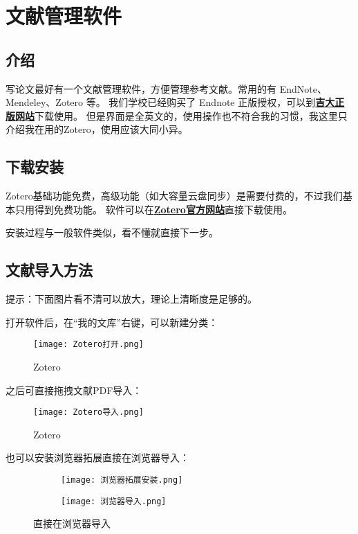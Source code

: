\section{文献管理软件}
\subsection{介绍}

写论文最好有一个文献管理软件，方便管理参考文献。常用的有 EndNote、Mendeley、Zotero 等。
我们学校已经购买了 Endnote 正版授权，可以到\textbf{\textcolor{blue}{\href{https://zbhrj1.jlu.edu.cn/download/EndNote21W.html}{吉大正版网站}}}下载使用。
但是界面是全英文的，使用操作也不符合我的习惯，我这里只介绍我在用的Zotero，使用应该大同小异。



\subsection{下载安装}

Zotero基础功能免费，高级功能（如大容量云盘同步）是需要付费的，不过我们基本只用得到免费功能。
软件可以在\textbf{\textcolor{blue}{\href{https://www.zotero.org/}{Zotero官方网站}}}直接下载使用。

安装过程与一般软件类似，看不懂就直接下一步。

\subsection{文献导入方法}

提示：下面图片看不清可以放大，理论上清晰度是足够的。

打开软件后，在“我的文库”右键，可以新建分类：

\begin{figure}[htbp]
    \centering
    \texttt{[image: Zotero打开.png]}
    \caption{Zotero}
    \label{Zotero 1}
\end{figure}

\newpage

之后可直接拖拽文献PDF导入：

\begin{figure}[htbp]
    \centering
    \texttt{[image: Zotero导入.png]}
    \caption{Zotero}
    \label{Zotero 2}
\end{figure}

也可以安装浏览器拓展直接在浏览器导入：
\begin{figure}[h]
    \centering
    \begin{subfigure}[c]{0.48\textwidth}
      \texttt{[image: 浏览器拓展安装.png]}
      \label{Zotero 3-1}
    \end{subfigure}
    \hfill
    \begin{subfigure}[c]{0.48\textwidth}
      \texttt{[image: 浏览器导入.png]}
      \label{Zotero 3-2}
    \end{subfigure}
    \caption{直接在浏览器导入}
    \label{Zotero 3}
\end{figure}

